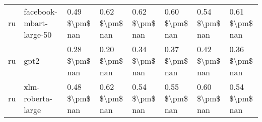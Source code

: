 \begin{tabular}{llllllll}
      ru &            facebook-mbart-large-50 & 0.49 \$\textbackslash pm\$ nan &            0.62 \$\textbackslash pm\$ nan &        0.62 \$\textbackslash pm\$ nan &         0.60 \$\textbackslash pm\$ nan &                          0.54 \$\textbackslash pm\$ nan &     0.61 \$\textbackslash pm\$ nan \\
      ru &                               gpt2 & 0.28 \$\textbackslash pm\$ nan &            0.20 \$\textbackslash pm\$ nan &        0.34 \$\textbackslash pm\$ nan &         0.37 \$\textbackslash pm\$ nan &                          0.42 \$\textbackslash pm\$ nan &     0.36 \$\textbackslash pm\$ nan \\
      ru &                  xlm-roberta-large & 0.48 \$\textbackslash pm\$ nan &            0.62 \$\textbackslash pm\$ nan &        0.54 \$\textbackslash pm\$ nan &         0.55 \$\textbackslash pm\$ nan &                          0.60 \$\textbackslash pm\$ nan &     0.54 \$\textbackslash pm\$ nan \\
\bottomrule
\end{tabular}
